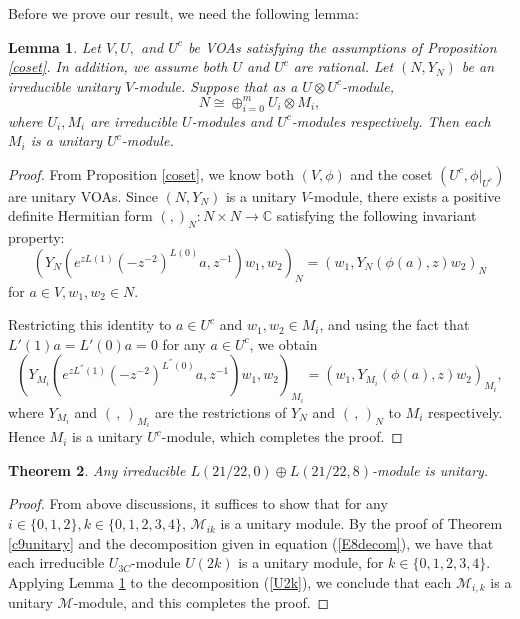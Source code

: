 \documentclass{article}
\newtheorem{lemma}{Lemma}[section]
\newtheorem{theorem}[lemma]{Theorem}
\begin{document}
Before we prove our result, we need the following lemma:
\begin{lemma}\label{cosetmod}
	Let $V, U,$ and $U^c$ be VOAs satisfying the assumptions of Proposition \ref{coset}. In addition, we assume both $U$ and $U^c$ are rational. Let $(N, Y_N)$ be an irreducible unitary $V$-module. Suppose that as a $U\otimes U^c$-module, $$N\cong\oplus_{i=0}^{m}U_i\otimes M_i,$$
	where $U_i, M_i$ are irreducible $U$-modules and $U^c$-modules respectively. Then each $M_i$ is a unitary $U^c$-module.
\end{lemma}
\begin{proof}
	From Proposition \ref{coset}, we know both $(V,\phi)$ and the coset $(U^c, \phi|_{U^c})$ are unitary VOAs. Since %
	$(N, Y_N)$ is a unitary $V$-module, there exists a positive definite
	Hermitian form $(,)_N: N\times N\to \mathbb{C}$  satisfying the following invariant property:
	\begin{equation}\label{invariant}
		(Y_N(e^{zL(1)}(-z^{-2})^{L(0)}a, z^{-1})w_1, w_2)_N=(w_1, Y_N(\phi(a),z)w_2)_N
	\end{equation}
	for $a\in V, w_1, w_2\in N$.
	
	Restricting this identity to $a\in U^c$ and $w_1, w_2\in M_i$, and using the fact that $L'(1)a=L'(0)a=0$ for any $a\in U^c$, we obtain
	\begin{equation}\label{invariant2}
		(Y_{M_i}(e^{zL^{''}(1)}(-z^{-2})^{L^{''}(0)}a, z^{-1})w_1, w_2)_{M_i}=(w_1, Y_{M_i}(\phi(a),z)w_2)_{M_{i}},
	\end{equation}
	where  $Y_{M_i}$ and $(\, , \,)_{M_i}$ are the restrictions of $Y_N$ and $(\, ,\,)_{N}$ to $M_i$ respectively. Hence $M_i$ is a unitary $U^c$-module, which completes the proof.
\end{proof}

\begin{theorem}
	Any irreducible $L(21/22, 0)\oplus L(21/22, 8)$-module is unitary.
\end{theorem}
\begin{proof}
	From above discussions, it suffices to show that for any $i\in\{0, 1, 2\}, k\in\{0, 1, 2, 3, 4\}$, $\mathcal{M}_{ik}$ is a unitary module. By the proof of Theorem \ref{c9unitary} and the decomposition given in equation
	(\ref{E8decom}), we have that each irreducible $U_{3C}$-module $U(2k)$ is a unitary module, for $k\in\{0, 1, 2, 3, 4\}$. Applying  Lemma \ref{cosetmod} to the decomposition (\ref{U2k}), we conclude that each $\mathcal{M}_{i,k}$ is a unitary $\mathcal{M}$-module, and this completes the proof.
\end{proof}
\end{document}
